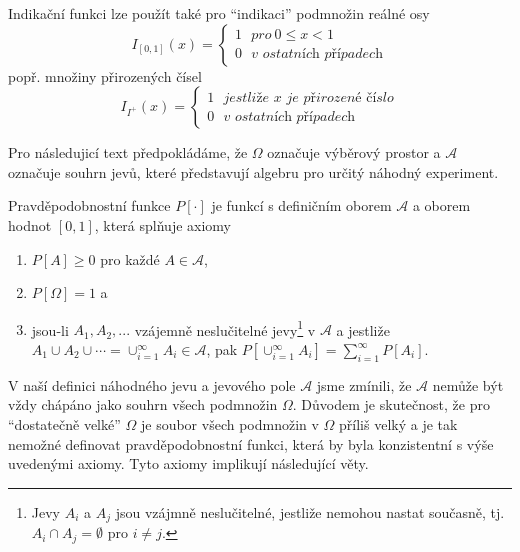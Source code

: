 Indikační funkci lze použít také pro ``indikaci'' podmnožin reálné osy
\begin{equation*}
I_{[0,1]}(x) =
\begin{cases}
1~~~\textit{pro}~ 0 \le x < 1\\
0~~~\textit{v ostatních případech}
\end{cases}
\end{equation*}
popř. množiny přirozených čísel
\begin{equation*}
I_{I^+}(x) =
\begin{cases}
1~~~\textit{jestliže $x$ je přirozené číslo}\\
0~~~\textit{v ostatních případech}
\end{cases}
\end{equation*}

Pro následujicí text předpokládáme, že $\Omega$ označuje výběrový prostor a $\mathscr{A}$ označuje souhrn jevů, které představují algebru pro určitý náhodný experiment.

\begin{definition}
Pravděpodobnostní funkce $P[\cdot]$ je funkcí s definičním oborem $\mathscr{A}$ a oborem hodnot $[0, 1]$, která splňuje axiomy
\begin{enumerate}
\item $P[A] \ge 0$ pro každé $A \in \mathscr{A}$,
\item $P[\Omega] = 1$ a
\item jsou-li $A_1, A_2, ...$ vzájemně neslučitelné jevy\footnote{Jevy $A_i$ a $A_j$ jsou vzájmně neslučitelné, jestliže nemohou nastat současně, tj. $A_i \cap A_j = \emptyset$ pro $i \not= j$.} v $\mathscr{A}$ a jestliže $A_1 \cup A_2 \cup \cdots = \cup_{i=1}^{\infty}A_i \in \mathscr{A}$, pak $P[\cup_{i=1}^{\infty}A_i] = \sum_{i=1}^{\infty}P[A_i]$.
\end{enumerate}
\end{definition}

V naší definici náhodného jevu a jevového pole $\mathscr{A}$ jsme zmínili, že $\mathscr{A}$ nemůže být vždy chápáno jako souhrn všech podmnožin $\Omega$. Důvodem je skutečnost, že pro ``dostatečně velké'' $\Omega$ je soubor všech podmnožin v $\Omega$ příliš velký a je tak nemožné definovat pravděpodobnostní funkci, která by byla konzistentní s výše uvedenými axiomy. Tyto axiomy implikují následující věty.

